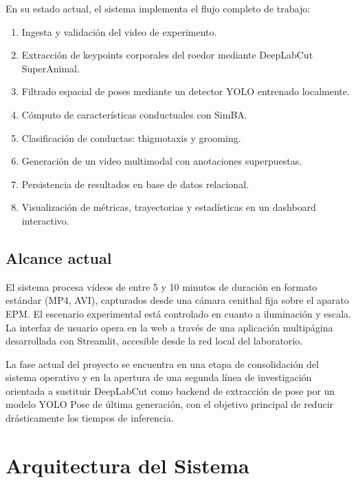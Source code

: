 \documentclass[12pt]{report}
\begin{document}
En su estado actual, el sistema implementa el flujo completo de trabajo:

\begin{enumerate}[leftmargin=*, label=\arabic*.]
    \item Ingesta y validación del video de experimento.
    \item Extracción de keypoints corporales del roedor mediante DeepLabCut SuperAnimal.
    \item Filtrado espacial de poses mediante un detector YOLO entrenado localmente.
    \item Cómputo de características conductuales con SimBA.
    \item Clasificación de conductas: thigmotaxis y grooming.
    \item Generación de un video multimodal con anotaciones superpuestas.
    \item Persistencia de resultados en base de datos relacional.
    \item Visualización de métricas, trayectorias y estadísticas en un dashboard interactivo.
\end{enumerate}

\section{Alcance actual}

El sistema procesa videos de entre 5 y 10 minutos de duración en formato
estándar (MP4, AVI), capturados desde una cámara cenithal fija sobre el aparato
EPM. El escenario experimental está controlado en cuanto a iluminación y escala.
La interfaz de usuario opera en la web a través de una aplicación multipágina
desarrollada con Streamlit, accesible desde la red local del laboratorio.

La fase actual del proyecto se encuentra en una etapa de consolidación del
sistema operativo y en la apertura de una segunda línea de investigación
orientada a sustituir DeepLabCut como backend de extracción de pose por un
modelo YOLO Pose de última generación, con el objetivo principal de reducir
drásticamente los tiempos de inferencia.

\chapter{Arquitectura del Sistema}
\end{document}
